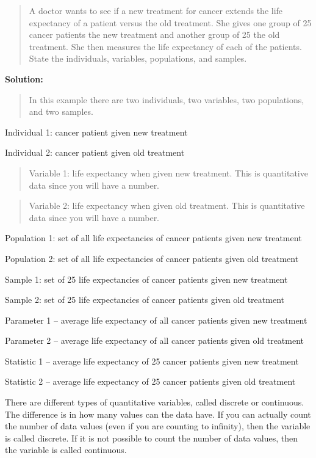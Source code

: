 \documentclass[]{book}
\begin{document}
\begin{quote}
A doctor wants to see if a new treatment for cancer extends the life expectancy of a patient versus the old treatment. She gives one group of 25 cancer patients the new treatment and another group of 25 the old treatment. She then measures the life expectancy of each of the patients. State the individuals, variables, populations, and samples.
\end{quote}

\textbf{Solution:}

\begin{quote}
In this example there are two individuals, two variables, two populations, and two samples.
\end{quote}

Individual 1: cancer patient given new treatment

Individual 2: cancer patient given old treatment

\begin{quote}
Variable 1: life expectancy when given new treatment. This is quantitative data since you will have a number.
\end{quote}

\begin{quote}
Variable 2: life expectancy when given old treatment. This is quantitative data since you will have a number.
\end{quote}

Population 1: set of all life expectancies of cancer patients given new treatment

Population 2: set of all life expectancies of cancer patients given old treatment

Sample 1: set of 25 life expectancies of cancer patients given new treatment

Sample 2: set of 25 life expectancies of cancer patients given old treatment

Parameter 1 -- average life expectancy of all cancer patients given new treatment

Parameter 2 -- average life expectancy of all cancer patients given old treatment

Statistic 1 -- average life expectancy of 25 cancer patients given new treatment

Statistic 2 -- average life expectancy of 25 cancer patients given old treatment

There are different types of quantitative variables, called discrete or continuous. The difference is in how many values can the data have. If you can actually count the number of data values (even if you are counting to infinity), then the variable is called discrete. If it is not possible to count the number of data values, then the variable is called continuous.
\end{document}

